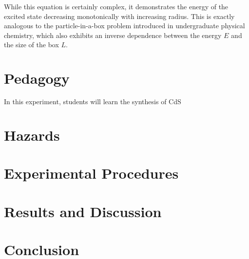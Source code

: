 \documentclass[journal = jceda8, manuscript = article]{achemso}
\begin{document}
While this equation is certainly complex, it demonstrates the energy of the
excited state decreasing monotonically with increasing radius. This is exactly
analogous to the particle-in-a-box problem introduced in undergraduate physical
chemistry, which also exhibits an inverse dependence between the energy $E$ and
the size of the box $L$.

\section{Pedagogy}


In this experiment, students will learn the synthesis of CdS

\section{Hazards}


\section{Experimental Procedures}


\section{Results and Discussion}


\section{Conclusion}



\end{document}
